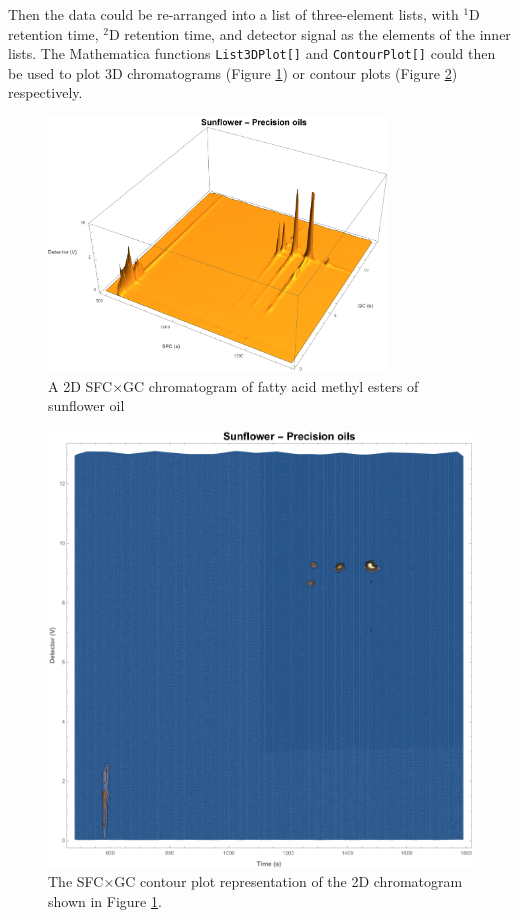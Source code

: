 Then the data could be re-arranged into a list of three-element lists, with
$^1$D retention time, $^2$D retention time, and detector signal as the elements
of the inner lists. The Mathematica functions \texttt{List3DPlot[]} and
\texttt{ContourPlot[]} could then be used to plot 3D chromatograms (Figure
\ref{fig:2DChromatogram}) or contour plots (Figure \ref{fig:Contourplot})
respectively.

\begin{figure}
	\centering
	\includegraphics[width=0.8\textwidth]{Figures/2DChromatogram.pdf}
	\decoRule
	
\caption[A 2D SFC×GC chromatogram]{A 2D SFC×GC chromatogram of fatty acid methyl
esters of sunflower oil}
	
	\label{fig:2DChromatogram}
\end{figure}


\begin{figure}
	\centering
	\includegraphics[width=\textwidth]{Figures/Contourplot.pdf}
	\decoRule
	
\caption[A 2D SFC×GC chromatogram]{The SFC×GC contour plot representation of the
2D chromatogram shown in Figure \ref{fig:2DChromatogram}.}
	
	\label{fig:Contourplot}
\end{figure}



